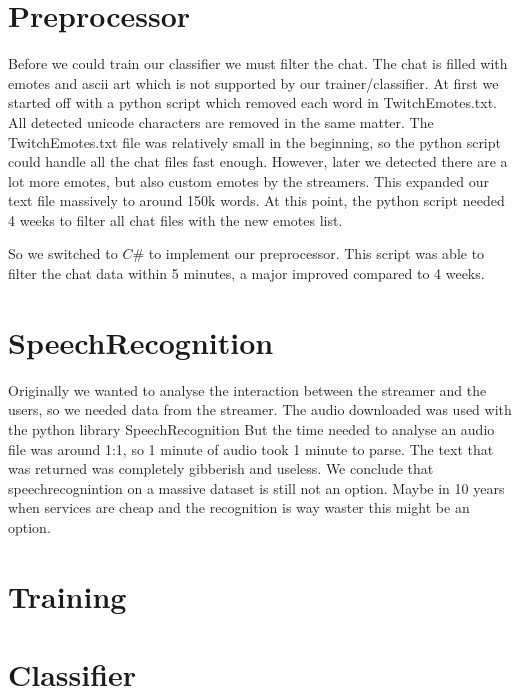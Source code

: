 \documentclass[final]{report}
\begin{document}
\section{Preprocessor}
Before we could train our classifier we must filter the chat. The chat is filled with emotes and ascii art which is not supported by our trainer/classifier.
At first we started off with a python script which removed each word in TwitchEmotes.txt. All detected unicode characters are removed in the same matter.
The TwitchEmotes.txt file was relatively small in the beginning, so the python script could handle all the chat files fast enough. However, later we detected there are a lot more emotes, but also custom emotes by the streamers.
This expanded our text file massively to around 150k words. At this point, the python script needed 4 weeks to filter all chat files with the new emotes list.

So we switched to $C\#$ to implement our preprocessor.
This script was able to filter the chat data within 5 minutes, a major improved compared to 4 weeks.

\section{SpeechRecognition}
Originally we wanted to analyse the interaction between the streamer and the users, so we needed data from the streamer.
The audio downloaded was used with the python library SpeechRecognition %
But the time needed to analyse an audio file was around 1:1, so 1 minute of audio took 1 minute to parse. The text that was returned was completely gibberish and useless.
We conclude that speechrecognintion on a massive dataset is still not an option. Maybe in 10 years when services are cheap and the recognition is way waster this might be an option.

\section{Training}

\section{Classifier}
\end{document}

